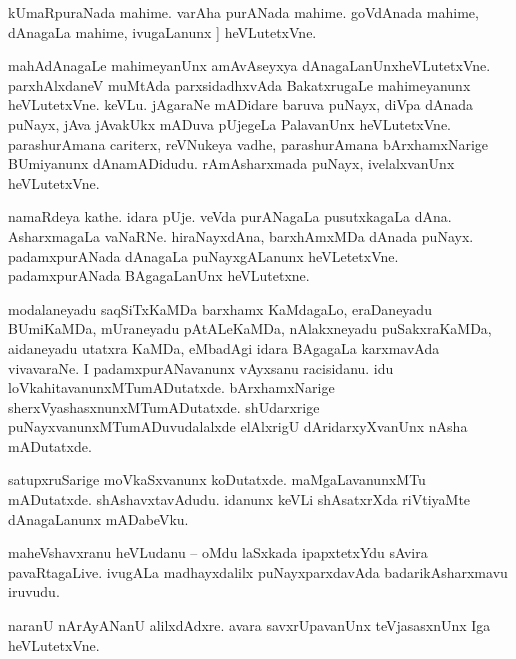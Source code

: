 \documentclass{article}
\begin{document}
\begin{mn}%
kUmaRpuraNada mahime. varAha purANada mahime. goVdAnada mahime, dAnagaLa mahime, ivugaLanunx ]
heVLutetxVne.
\end{mn}

\begin{mn}%
mahAdAnagaLe mahimeyanUnx amAvAseyxya dAnagaLanUnxheVLutetxVne. parxhAlxdaneV muMtAda 
parxsidadhxvAda BakatxrugaLe mahimeyanunx heVLutetxVne. keVLu. jAgaraNe mADidare baruva 
puNayx, diVpa dAnada puNayx, jAva jAvakUkx mADuva pUjegeLa PalavanUnx heVLutetxVne. 
parashurAmana cariterx, reVNukeya vadhe, parashurAmana bArxhamxNarige BUmiyanunx 
dAnamADidudu. rAmAsharxmada puNayx, ivelalxvanUnx heVLutetxVne.
\end{mn}

\begin{mn}%
namaRdeya kathe. idara pUje. veVda purANagaLa pusutxkagaLa dAna. AsharxmagaLa vaNaRNe. 
hiraNayxdAna, barxhAmxMDa dAnada puNayx. padamxpurANada dAnagaLa puNayxgALanunx 
heVLetetxVne. padamxpurANada BAgagaLanUnx heVLutetxne.
\end{mn}

\begin{mn}%
modalaneyadu saqSiTxKaMDa barxhamx KaMdagaLo, eraDaneyadu BUmiKaMDa, mUraneyadu pAtALeKaMDa, 
nAlakxneyadu puSakxraKaMDa, aidaneyadu utatxra KaMDa, eMbadAgi idara BAgagaLa karxmavAda 
vivavaraNe. I padamxpurANavanunx vAyxsanu racisidanu. idu loVkahitavanunxMTumADutatxde. 
bArxhamxNarige sherxVyashasxnunxMTumADutatxde. shUdarxrige puNayxvanunxMTumADuvudalalxde 
elAlxrigU dAridarxyXvanUnx nAsha mADutatxde.
\end{mn}

\begin{mn}%
satupxruSarige moVkaSxvanunx koDutatxde. maMgaLavanunxMTu mADutatxde. shAshavxtavAdudu. 
idanunx keVLi shAsatxrXda riVtiyaMte dAnagaLanunx mADabeVku.
\end{mn}


\begin{mn}%
maheVshavxranu heVLudanu -- oMdu laSxkada ipapxtetxYdu sAvira pavaRtagaLive. ivugALa 
madhayxdalilx puNayxparxdavAda badarikAsharxmavu iruvudu.
\end{mn}

\begin{mn}%
naranU nArAyANanU alilxdAdxre. avara savxrUpavanUnx teVjasasxnUnx Iga heVLutetxVne.
\end{mn}
\end{document}
